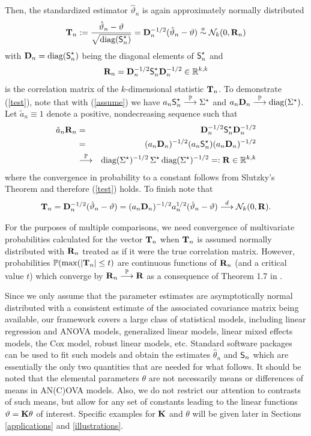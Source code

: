 \documentclass[12pt,a4paper]{article}
\begin{document}
Then, the standardized estimator $\hat{\vartheta}_n$ is again approximately normally
distributed
\begin{eqnarray} \label{test}
\mathbf{T}_n := \frac{\hat{\vartheta}_n - \vartheta}{\sqrt{\text{diag}(\textsf{S}^\star_n)}} = \mathbf{D}_n^{-1/2}
(\hat{\vartheta}_n - \vartheta) \stackrel{a}{\sim} \mathcal{N}_k(0, \mathbf{R}_n)
\end{eqnarray}
with $\mathbf{D}_n = \text{diag}(\textsf{S}^\star_n)$ being the diagonal elements of
$\textsf{S}^\star_n$ and 
\begin{eqnarray*}
\mathbf{R}_n = \mathbf{D}_n^{-1/2} \textsf{S}^\star_n \mathbf{D}_n^{-1/2} \in \mathbb{R}^{k,k} 
\end{eqnarray*}
is the correlation matrix of the $k$-dimensional statistic 
$\mathbf{T}_n$. To demonstrate (\ref{test}), note that 
with (\ref{assume}) we have $a_n \textsf{S}^\star_n \stackrel{\mathbb{P}}{\longrightarrow} \Sigma^\star$ 
and $a_n \mathbf{D}_n \stackrel{\mathbb{P}}{\longrightarrow} \text{diag}(\Sigma^\star)$. Let $\tilde{a}_n
\equiv 1$  denote a positive, nondecreasing sequence such that
\begin{eqnarray*}
\tilde{a}_n \mathbf{R}_n  & = & \mathbf{D}_n^{-1/2} \textsf{S}^\star_n \mathbf{D}_n^{-1/2} \\
& = & (a_n \mathbf{D}_n)^{-1/2} (a_n \textsf{S}^\star_n) (a_n \mathbf{D}_n)^{-1/2} \\
& \stackrel{\mathbb{P}}{\longrightarrow} & \text{diag}(\Sigma^\star)^{-1/2} \, \Sigma^\star \, \text{diag}(\Sigma^\star)^{-1/2} 
=: \mathbf{R} \in \mathbb{R}^{k,k}
\end{eqnarray*}
where the convergence in probability to a constant follows from
Slutzky's Theorem \citep[Theorem 1.5.4,][]{Serfling1980} and 
therefore (\ref{test}) holds. To finish note that
\begin{eqnarray*}
\mathbf{T}_n = \mathbf{D}_n^{-1/2} (\hat{\vartheta}_n - \vartheta) = (a_n \mathbf{D}_n)^{-1/2}
a_n^{1/2} (\hat{\vartheta}_n - \vartheta) \stackrel{d}{\longrightarrow} \mathcal{N}_k(0, \mathbf{R}).
\end{eqnarray*}

For the purposes of multiple comparisons, we need convergence of
multivariate probabilities calculated for the vector $\mathbf{T}_n$ when $\mathbf{T}_n$ is
assumed normally distributed with $\mathbf{R}_n$ treated as if it were the true
correlation matrix.
However, probabilities $\mathbb{P}(\max(|\mathbf{T}_n| \le t)$
are continuous functions of $\mathbf{R}_n$ (and a critical value $t$) which converge by
$\mathbf{R}_n \stackrel{\mathbb{P}}{\longrightarrow} \mathbf{R}$ as a consequence of Theorem 1.7 in \cite{Serfling1980}.

Since we only assume that the parameter estimates are
asymptotically normal distributed with a consistent estimate of the
associated covariance matrix being available, our framework covers a large
class of statistical models, including linear regression and ANOVA models,
generalized linear models, linear mixed effects models, the Cox model,
robust linear models, etc. Standard software packages can be used to fit
such models and obtain the estimates $\hat{\theta}_n$ and $\textsf{S}_n$
which are essentially the only two quantities that are needed for what
follows. It should be noted that the elemental parameters $\theta$ are not
necessarily means or differences of means in AN(C)OVA models. Also, we do
not restrict our attention to contrasts of such means, but allow for any set
of constants leading to the linear functions $\vartheta = \mathbf{K}\theta $ of interest.
Specific examples for $\mathbf{K}$ and $\theta $ will be given later in Sections~%
\ref{applications} and \ref{illustrations}.
\end{document}
